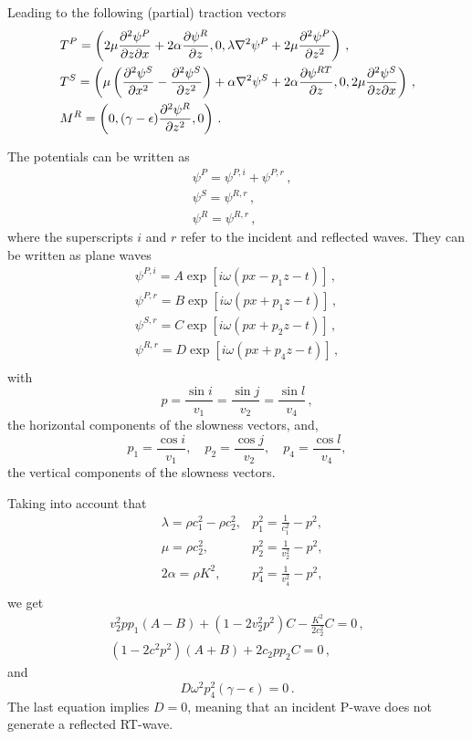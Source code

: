 \documentclass[12pt]{article}
\begin{document}
Leading to the following (partial) traction vectors
\begin{align*}
&T^P = \left(2\mu\pdv{\psi^P}{z}{x} + 2\alpha\pdv{\psi^R}{z}, 0, \lambda\laplacian\psi^P + 2\mu\pdv[2]{\psi^P}{z}\right)\, ,\\
&T^S = \left(\mu\left(\pdv[2]{\psi^S}{x} - \pdv[2]{\psi^S}{z}\right) + \alpha\laplacian\psi^S + 2\alpha\pdv{\psi^{RT}}{z}, 0, 2\mu\pdv{\psi^S}{z}{x}\right)\, ,\\
&M^{R} = \left(0, (\gamma - \epsilon)\pdv[2]{\psi^{R}}{z}, 0\right)\, .
\end{align*}

The potentials can be written as
\begin{align*}
&\psi^P = \psi^{P,i} + \psi^{P,r}\, ,\\
&\psi^S = \psi^{R,r}\, ,\\
&\psi^R = \psi^{R,r}\, ,
\end{align*}
where the superscripts \(i\) and \(r\) refer to the incident and reflected waves. They can be written as plane waves
\begin{align*}
\psi^{P,i} = A\exp\left[i\omega(px - p_1z - t)\right]\, ,\\
\psi^{P,r} = B\exp\left[i\omega(px + p_1z - t)\right]\, ,\\
\psi^{S,r} = C\exp\left[i\omega(px + p_2z - t)\right]\, ,\\
\psi^{R,r} = D\exp\left[i\omega(px + p_4z - t)\right]\, ,\\
\end{align*}
with
\[p=\frac{\sin i}{v_1} = \frac{\sin j}{v_2} = \frac{\sin l}{v_4}\, ,\]
the horizontal components of the slowness vectors, and,
\[p_1 = \frac{\cos i}{v_1},\quad p_2 = \frac{\cos j}{v_2},\quad p_4 = \frac{\cos l}{v_4},\]
the vertical components of the slowness vectors.

Taking into account that
\begin{align*}
&\lambda = \rho c_1^2 - \rho c_2^2, &p_1^2 = \frac{1}{c_1^2} - p^2,\\
&\mu = \rho c_2^2 , &p_2^2 = \frac{1}{v_2^2} - p^2,\\
&2\alpha = \rho K^2, &p_4^2 = \frac{1}{v_4^2} - p^2,\\
\end{align*}
we get
\begin{align*}
v_2^2 p p_1 (A - B) + (1 - 2v_2^2 p^2)C - \frac{K^2}{2c_2^2}C = 0\, ,\\
(1 - 2c^2p^2)(A + B) + 2c_2p p_2 C = 0\, ,
\end{align*}
and
\[D\omega^2 p_4^2 (\gamma - \epsilon) = 0\, .\]
The last equation implies \(D = 0\), meaning that an incident P-wave does not generate a reflected RT-wave.
\end{document}

